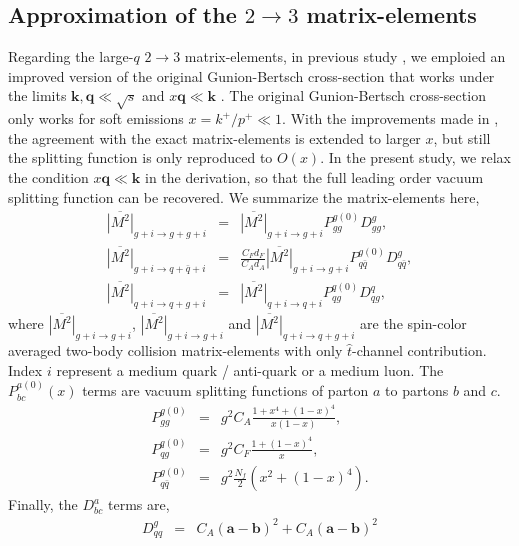 \documentclass[aps, prc, reprint, amsmath, groupedaddress, nofootinbib]{revtex4-1}
\begin{document}
\begin{appendices}
\section{Approximation of the $2\rightarrow 3$ matrix-elements}
\label{app:23}
Regarding the large-$q$ $2\rightarrow 3$ matrix-elements, in previous study \cite{Ke:2018tsh}, we emploied an improved version of the original Gunion-Bertsch cross-section that works under the limits $\mathbf{k}, \mathbf{q} \ll \sqrt{s}$ and $x \mathbf{q} \ll \mathbf{k}$ \cite{PhysRevD.25.746,Fochler:2013epa,Uphoff:2014hza}.
The original Gunion-Bertsch cross-section \cite{PhysRevD.25.746} only works for soft emissions $x=k^+/p^+ \ll 1$. 
With the improvements made in \cite{Fochler:2013epa,Uphoff:2014hza}, the agreement with the exact matrix-elements is extended to larger $x$, but still the splitting function is only reproduced to $O(x)$.
In the present study, we relax the condition $x \mathbf{q} \ll \mathbf{k}$ in the derivation, so that the full leading order vacuum splitting function can be recovered.
We summarize the matrix-elements here,
\begin{eqnarray}
\overline{|M^2|}_{g+i\rightarrow g+g+i} &=& \overline{|M^2|}_{g+i\rightarrow g+i} P_{gg}^{g(0)}  D_{gg}^{g},\\
\overline{|M^2|}_{g+i\rightarrow q+\bar{q}+i} &=& \frac{C_F d_F}{C_A d_A}\overline{|M^2|}_{g+i\rightarrow g+i} P_{q\bar{q}}^{g(0)} D_{q\bar{q}}^{g},\\
\overline{|M^2|}_{q+i\rightarrow q+g+i} &=& \overline{|M^2|}_{q+i\rightarrow q+i} P_{qg}^{q(0)} D_{qg}^{q},
\end{eqnarray}
where $\overline{|M^2|}_{g+i\rightarrow g+i}$, $\overline{|M^2|}_{g+i\rightarrow g+i}$ and $\overline{|M^2|}_{q+i\rightarrow q+g+i}$ are the spin-color averaged two-body collision matrix-elements with only $\hat{t}$-channel contribution.
Index $i$ represent a medium quark / anti-quark or a medium luon.
The $P_{bc}^{a(0)}(x)$ terms are vacuum splitting functions of parton $a$ to partons $b$ and $c$. 
\begin{eqnarray}
P_{gg}^{g(0)}  &=& g^2  C_A\frac{1+x^4+(1-x)^4}{x(1-x)},\\
P_{qg}^{q(0)} &=& g^2  C_F\frac{1+(1-x)^4}{x},\\
P_{q\bar{q}}^{g(0)} &=& g^2  \frac{N_f}{2}\left(x^2+(1-x)^4\right).
\end{eqnarray}
Finally, the $D_{bc}^{a}$ terms are,
\begin{eqnarray}
D_{qq}^{g} &=& 
C_A(\mathbf{a}-\mathbf{b})^2 + C_A(\mathbf{a}-\mathbf{b})^2 \\\nonumber

\end{eqnarray}
\end{appendices}
\end{document}
